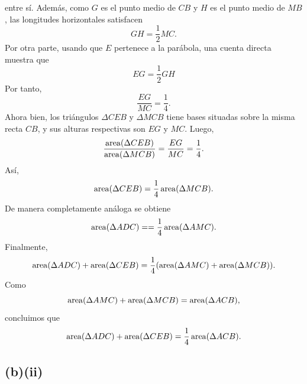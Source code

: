 \documentclass[12pt,a4paper]{article}
\begin{document}
\begin{solucion}
        entre sí. Además, como $G$ es el punto medio de $CB$ y $H$ es el punto medio de $MB$,
        las longitudes horizontales satisfacen
        \begin{equation*}
            GH=\frac{1}{2}MC.
        \end{equation*}
        Por otra parte, usando que $E$ pertenece a la parábola, una cuenta directa muestra que
        \begin{equation*}
            EG=\frac{1}{2}GH
        \end{equation*}
        Por tanto,
        \begin{equation*}
            \frac{EG}{MC}=\frac{1}{4}.
        \end{equation*}
        Ahora bien, los triángulos $\Delta CEB$ y $\Delta MCB$ tiene bases situadas sobre la misma
        recta $CB$, y sus alturas respectivas son $EG$ y $MC$. Luego,
        \begin{equation*}
            \frac{\operatorname{area}(\Delta CEB)}{\operatorname{area}(\Delta MCB)}=\frac{EG}{MC}=\frac{1}{4}.
        \end{equation*}
        Así,
        \begin{equation*}
            \operatorname{area}(\Delta CEB)=\frac{1}{4}\operatorname{area}(\Delta MCB).
        \end{equation*}
        De manera completamente análoga se obtiene
        \begin{equation*}
            \operatorname{area}(\Delta ADC)==\frac{1}{4}\operatorname{area}(\Delta AMC).
        \end{equation*}
        Finalmente,
        \begin{equation*}
            \operatorname{area}(\Delta ADC)+\operatorname{area}(\Delta CEB)=\frac{1}{4}(\operatorname{area}(\Delta AMC)+\operatorname{area}(\Delta MCB)).
        \end{equation*}
        Como
        \begin{equation*}
            \operatorname{area}(\Delta AMC)+\operatorname{area}(\Delta MCB)=\operatorname{area}(\Delta ACB),
        \end{equation*}
        concluimos que
        \begin{equation*}
            \operatorname{area}(\Delta ADC)+\operatorname{area}(\Delta CEB)=\frac{1}{4}\operatorname{area}(\Delta ACB).
        \end{equation*}

        \subsection*{(b)(ii)}


\end{solucion}
\end{document}
